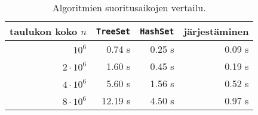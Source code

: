 \begin{table}
\center
\begin{tabular}{rrrr}
taulukon koko $n$ & \texttt{TreeSet} & \texttt{HashSet} & järjestäminen \\
\hline
$10^6$ & 0.74 s & 0.25 s & 0.09 s \\
$2 \cdot 10^6$ & 1.60 s & 0.45 s & 0.19 s \\
$4 \cdot 10^6$ & 5.60 s & 1.56 s & 0.52 s \\
$8 \cdot 10^6$ & 12.19 s & 4.50 s & 0.97 s \\
\end{tabular}
\caption{Algoritmien suoritusaikojen vertailu.}
\label{tab:eriver}
\end{table}
